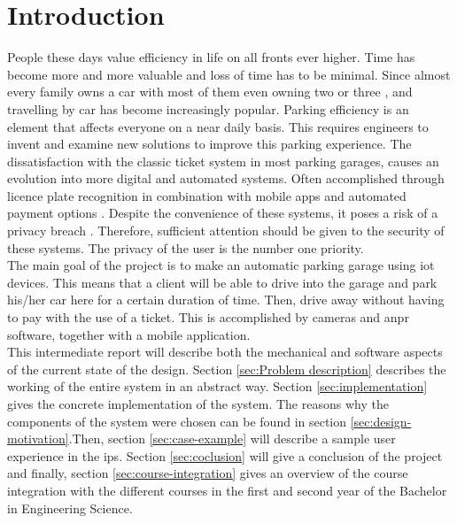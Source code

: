 \section{Introduction}\label{Introduction}

People these days value efficiency in life on all fronts ever higher. Time has become more and more valuable and loss of time has to be minimal. Since almost every family owns a car with most of them even owning two or three \cite{vehicles_in_families}, and travelling by car has become increasingly popular. Parking efficiency is an element that affects everyone on a near daily basis. This requires engineers to invent and examine new solutions to improve this parking experience. The dissatisfaction with the classic ticket system in most parking garages, causes an evolution into more digital and automated systems. Often accomplished through licence plate recognition in combination with mobile apps and automated payment options \cite{4411}. Despite the convenience of these systems, it poses a risk of a privacy breach \cite{privacy_breach}. Therefore, sufficient attention should be given to the security of these systems. The privacy of the user is the number one priority.\\

The main goal of the project is to make an automatic parking garage using \ac{iot} devices. This means that a client will be able to drive into the garage and park his/her car here for a certain duration of time. Then, drive away without having to pay with the use of a ticket. This is accomplished by cameras and \ac{anpr} software, together with a mobile application. \\

This intermediate report will describe both the mechanical and software aspects of the current state of the design. Section \ref{sec:Problem description} describes the working of the entire system in an abstract way. Section \ref{sec:implementation} gives the concrete implementation of the system. The reasons why the components of the system were chosen can be found in section \ref{sec:design-motivation}.Then, section \ref{sec:case-example} will describe a sample user experience in the \ac{ips}. Section \ref{sec:coclusion} will give a conclusion of the project and finally, section \ref{sec:course-integration} gives an overview of the course integration with the different courses in the first and second year of the Bachelor in Engineering Science.

